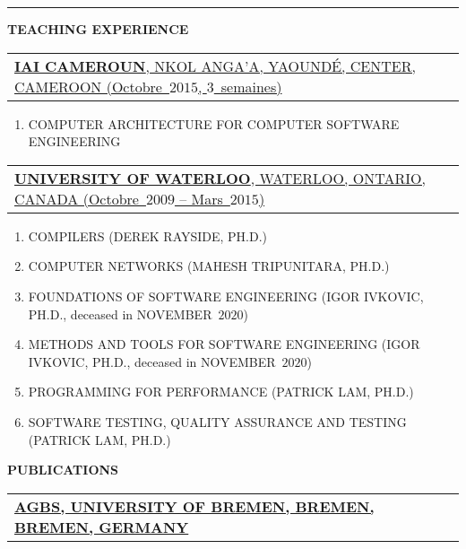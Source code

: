 \documentclass[9pt,a4paper]{article} %
\makeatletter
\newcommand{\headerrow}[2]
{\begin{tabular*}{\linewidth}{l@{\extracolsep{\fill}}r}
	#1 &
	#2 \\
\end{tabular*}}
\newcommand{\headerrowONE}[1]{\headerrow{#1}{}}
\makeatother
\begin{document}
\vspace{1em}


\hrule
\begin{center}
{\large \textbf{TEACHING EXPERIENCE}}
\end{center}

\vspace{0.5em}

\headerrowONE{\href{http://iaicameroun.com}{\textbf{IAI CAMEROUN}, NKOL ANGA'A, YAOUNDÉ, CENTER, CAMEROON (Octobre~$2015$, $3$~semaines)}}
\begin{enumerate}
	\item COMPUTER ARCHITECTURE FOR COMPUTER SOFTWARE ENGINEERING
\end{enumerate}

\vspace{0.5em}

\headerrowONE{\href{http://ece.uwaterloo.ca}{\textbf{UNIVERSITY OF WATERLOO}, WATERLOO, ONTARIO, CANADA (Octobre~$2009$ -- Mars~$2015$)}}

\begin{enumerate}
	\itemsep -0.3em
	\item COMPILERS (DEREK RAYSIDE, PH.D.)
	\item COMPUTER NETWORKS (MAHESH TRIPUNITARA, PH.D.)
	\item FOUNDATIONS OF SOFTWARE ENGINEERING (IGOR IVKOVIC, PH.D., deceased in NOVEMBER~$2020$)
	\item METHODS AND TOOLS FOR SOFTWARE ENGINEERING (IGOR IVKOVIC, PH.D., deceased in NOVEMBER~$2020$)
	\item PROGRAMMING FOR PERFORMANCE (PATRICK LAM, PH.D.)
	\item SOFTWARE TESTING, QUALITY ASSURANCE AND TESTING (PATRICK LAM, PH.D.)
\end{enumerate}


\vspace{1em}

\newpage
\begin{center}
{\large \textbf{PUBLICATIONS}}
\end{center}

\vspace{0.5em}

\headerrowONE{\href{http://www.informatik.uni-bremen.de/agbs}{
	\textbf{AGBS, UNIVERSITY OF BREMEN, BREMEN, BREMEN, GERMANY}}}

\vspace{0.3em}
\end{document}
